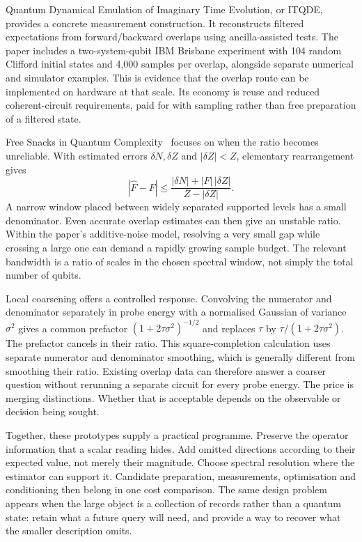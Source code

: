 Quantum Dynamical Emulation of Imaginary Time Evolution, or ITQDE, provides a concrete measurement construction. It reconstructs filtered expectations from forward/backward overlaps using ancilla-assisted tests. The paper includes a two-system-qubit IBM Brisbane experiment with 104 random Clifford initial states and 4,000 samples per overlap, alongside separate numerical and simulator examples. This is evidence that the overlap route can be implemented on hardware at that scale. Its economy is reuse and reduced coherent-circuit requirements, paid for with sampling rather than free preparation of a filtered state.~\cite{Leamer20249db941}

Free Snacks in Quantum Complexity~\cite{McCaul2025f7b569} focuses on when the ratio becomes unreliable. With estimated errors $\delta N,\delta Z$ and $|\delta Z|<Z$, elementary rearrangement gives
\[
 |\widehat F-F|\leq\frac{|\delta N|+|F|\,|\delta Z|}{Z-|\delta Z|}.
\]
A narrow window placed between widely separated supported levels has a small denominator. Even accurate overlap estimates can then give an unstable ratio. Within the paper's additive-noise model, resolving a very small gap while crossing a large one can demand a rapidly growing sample budget. The relevant bandwidth is a ratio of scales in the chosen spectral window, not simply the total number of qubits.

Local coarsening offers a controlled response. Convolving the numerator and denominator separately in probe energy with a normalised Gaussian of variance $\sigma^2$ gives a common prefactor $(1+2\tau\sigma^2)^{-1/2}$ and replaces $\tau$ by $\tau/(1+2\tau\sigma^2)$. The prefactor cancels in their ratio. This square-completion calculation uses separate numerator and denominator smoothing, which is generally different from smoothing their ratio. Existing overlap data can therefore answer a coarser question without rerunning a separate circuit for every probe energy. The price is merging distinctions. Whether that is acceptable depends on the observable or decision being sought.

Together, these prototypes supply a practical programme. Preserve the operator information that a scalar reading hides. Add omitted directions according to their expected value, not merely their magnitude. Choose spectral resolution where the estimator can support it. Candidate preparation, measurements, optimisation and conditioning then belong in one cost comparison. The same design problem appears when the large object is a collection of records rather than a quantum state: retain what a future query will need, and provide a way to recover what the smaller description omits.

